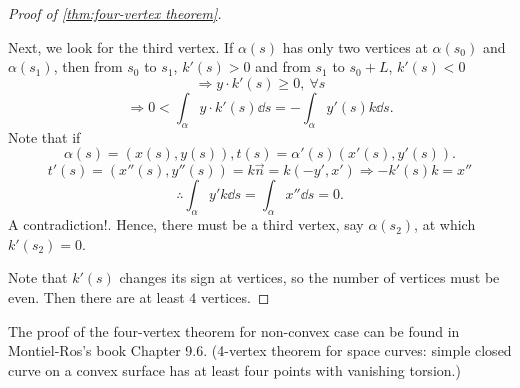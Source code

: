 \begin{proof}[Proof of \cref{thm:four-vertex theorem}]
\begin{center}
\begin{tikzpicture}[x=0.75pt,y=0.75pt,yscale=-1,xscale=1]
\end{tikzpicture}
    \end{center}

    Next, we look for the third vertex. If $\alpha(s)$ has only two vertices
    at $\alpha(s_0)$ and $\alpha(s_1)$, then from $s_0$ to $s_1$, $k'(s)>0$ 
    and from $s_1$ to $s_0+L$, $k'(s)<0$
    \[\Rightarrow y\cdot k'(s)\ge 0,~\forall s\]
    \[\Rightarrow 0<\int_\alpha y\cdot k'(s)\dd s=-\int_\alpha y'(s)k\dd s.\]
    Note that if 
    \[\alpha(s)=\left(x(s),y(s)\right), t(s)=\alpha'(s)\left(x'(s),y'(s)\right).\]
    \[t'(s)=\left(x''(s),y''(s)\right)=k \vec{n}=k(-y',x')\Rightarrow -k'(s)k=x''\]
    \[\therefore \int_\alpha y' k\dd s=\int_\alpha x'' \dd s=0.\]
    A contradiction!. Hence, there must be a third vertex, say $\alpha(s_2)$, at which $k'(s_2)=0$.

    Note that $k'(s)$ changes its sign at vertices, so the number of 
    vertices must be even. Then there are at least $4$ vertices.
\end{proof}
\begin{remark}
    The proof of the four-vertex theorem for non-convex 
    case can be found in Montiel-Ros's book Chapter 9.6. 
    (4-vertex theorem for space curves: simple closed curve on a convex surface has at least four points with vanishing torsion.)
\end{remark}
